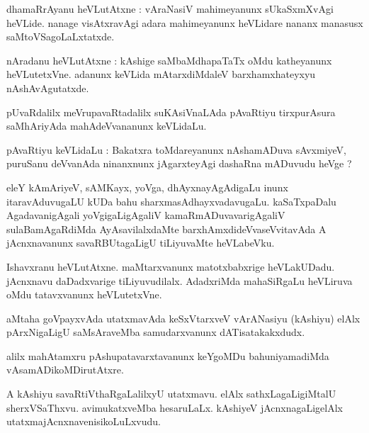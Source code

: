 \documentclass{article}
\begin{document}

\begin{mn}
dhamaRrAyanu heVLutAtxne : vAraNasiV mahimeyanunx sUkaSxmXvAgi heVLide. nanage visAtxravAgi 
adara mahimeyanunx heVLidare nananx manasusx saMtoVSagoLaLxtatxde.
\end{mn}

\begin{mn}
nAradanu heVLutAtxne : kAshige saMbaMdhapaTaTx oMdu katheyanunx heVLutetxVne. adanunx keVLida 
mAtarxdiMdaleV barxhamxhateyxyu nAshAvAgutatxde.
\end{mn}

\begin{mn}
pUvaRdalilx meVrupavaRtadalilx suKAsiVnaLAda pAvaRtiyu tirxpurAsura saMhAriyAda mahAdeVvananunx 
keVLidaLu.
\end{mn}

\begin{mn}
pAvaRtiyu keVLidaLu : Bakatxra toMdareyanunx nAshamADuva sAvxmiyeV, puruSanu deVvanAda ninanxnunx 
jAgarxteyAgi dashaRna mADuvudu heVge ?
\end{mn}

\begin{mn}
eleY kAmAriyeV, sAMKayx, yoVga, dhAyxnayAgAdigaLu inunx itaravAduvugaLU kUDa bahu 
sharxmasAdhayxvadavugaLu. kaSaTxpaDalu AgadavanigAgali yoVgigaLigAgaliV kamaRmADuvavarigAgaliV
sulaBamAgaRdiMda AyAsavilalxdaMte barxhAmxdideVvaseVvitavAda A jAcnxnavanunx savaRBUtagaLigU 
tiLiyuvaMte heVLabeVku.
\end{mn}

\begin{mn}
Ishavxranu heVLutAtxne. maMtarxvanunx matotxbabxrige heVLakUDadu. jAcnxnavu daDadxvarige 
tiLiyuvudilalx. AdadxriMda mahaSiRgaLu heVLiruva oMdu tatavxvanunx heVLutetxVne.
\end{mn}

\begin{mn}
aMtaha goVpayxvAda utatxmavAda keSxVtarxveV vArANasiyu (kAshiyu) elAlx pArxNigaLigU saMsAraveMba 
samudarxvanunx dATisatakakxdudx.
\end{mn}

\begin{mn}
alilx mahAtamxru pAshupatavarxtavanunx keYgoMDu bahuniyamadiMda vAsamADikoMDirutAtxre.
\end{mn}

\begin{mn}
A kAshiyu savaRtiVthaRgaLalilxyU utatxmavu. elAlx sathxLagaLigiMtalU sherxVSaThxvu. 
avimukatxveMba hesaruLaLx. kAshiyeV jAcnxnagaLigelAlx utatxmajAcnxnavenisikoLuLxvudu.
\end{mn}
\end{document}
